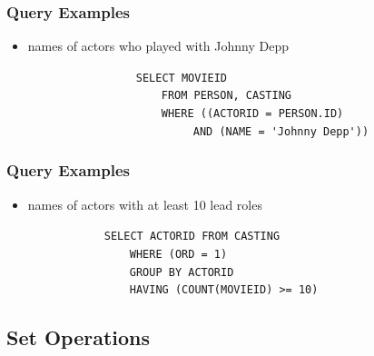 \documentclass[dvipsnames]{beamer}
\theoremstyle{plain}
\begin{document}
\begin{frame}[fragile]
  \frametitle{Query Examples}

  \begin{itemize}
    \item names of actors who played with Johnny Depp

    \medskip
{}
~~~~~~~~~~~~~~~~~\lstinline!SELECT MOVIEID!\\
~~~~~~~~~~~~~~~~~~~~~\lstinline!FROM PERSON, CASTING!\\
~~~~~~~~~~~~~~~~~~~~~\lstinline!WHERE ((ACTORID = PERSON.ID)!\\
~~~~~~~~~~~~~~~~~~~~~~~~~~\lstinline!AND (NAME = 'Johnny Depp'))!\\
  \end{itemize}
\end{frame}

\begin{frame}[fragile]
  \frametitle{Query Examples}

  \begin{itemize}
    \item names of actors with at least 10 lead roles

    \medskip
{}
~~~~~~~~~~~~\lstinline!SELECT ACTORID FROM CASTING!\\
~~~~~~~~~~~~~~~~\lstinline!WHERE (ORD = 1)!\\
\pause
~~~~~~~~~~~~~~~~\lstinline!GROUP BY ACTORID!\\
\pause
~~~~~~~~~~~~~~~~\lstinline!HAVING (COUNT(MOVIEID) >= 10)!\\
  \end{itemize}
\end{frame}

\subsection{Set Operations}
\end{document}
